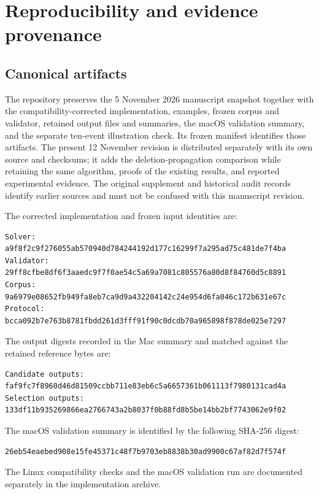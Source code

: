 \section{Reproducibility and evidence provenance}\label{app:reproducibility}

\subsection{Canonical artifacts}

The repository preserves the 5 November 2026 manuscript snapshot together
with the compatibility-corrected implementation, examples, frozen corpus and
validator, retained output files and summaries, the macOS validation summary,
and the separate ten-event illustration check. Its frozen manifest identifies
those artifacts. The present 12 November revision is distributed separately
with its own source and checksums; it adds the deletion-propagation comparison
while retaining the same algorithm, proofs of the existing results, and
reported experimental evidence. The original supplement and historical audit
records identify earlier sources and must not be confused with this
manuscript revision.

The corrected implementation and frozen input identities are:
\begin{lstlisting}
Solver:
a9f8f2c9f276055ab570940d784244192d177c16299f7a295ad75c481de7f4ba
Validator:
29ff8cfbe8df6f3aaedc9f7f0ae54c5a69a7081c805576a80d8f84760d5c8891
Corpus:
9a6979e08652fb949fa8eb7ca9d9a432204142c24e954d6fa046c172b631e67c
Protocol:
bcca092b7e763b8781fbdd261d3fff91f90c0dcdb70a965898f878de025e7297
\end{lstlisting}

The output digests recorded in the Mac summary and matched against the
retained reference bytes are:
\begin{lstlisting}
Candidate outputs:
faf9fc7f8960d46d81509ccbb711e83eb6c5a6657361b061113f7980131cad4a
Selection outputs:
133df11b935269866ea2766743a2b8037f0b88fd8b5be14bb2bf7743062e9f02
\end{lstlisting}

The macOS validation summary is identified by the following SHA-256 digest:
\begin{lstlisting}
26eb54eaebed908e15fe45371c48f7b9703eb8838b30ad9900c67af82d7f574f
\end{lstlisting}
The Linux compatibility checks and the macOS validation run are documented
separately in the implementation archive.

